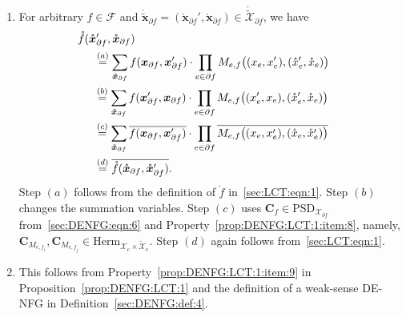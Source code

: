 \documentclass[journal]{IEEEtran}
\newcommand{\vect}[1]{ \bm{#1} }
\newcommand{\set}[1]{\mathcal{#1}}
\newcommand{\setF}{ \mathcal{F} }
\newcommand{\setpf}{ \partial f }
\newcommand{\vx}{ \vect{x} }
\newcommand{\setHerm}[1]{ \mathrm{Herm}_{#1} }
\newcommand{\setPSD}[1]{ \mathrm{PSD}_{#1} }
\newcommand{\matr}[1]{\vect{#1}}
\newcommand{\LCTtset}[1]{\mathring{\tilde{\mathcal{#1}}}}
\newcommand{\LCTset}[1]{\mathring{\mathcal{#1}}}
\newcommand{\LCTtv}[1]{ \mathring{ \tilde{ \vect{#1} } } }
\newcommand{\LCTv}[1]{ \mathring{ \vect{#1} } }
\newcommand{\LCT}[1]{ \mathring{#1} }
\newcommand{\ef}{ e,f }
\newcommand{\efi}{ e,f_i }
\newcommand{\efj}{ e,f_j }
\newcommand{\tvx}{ \tilde{\vect{x}}  }
\begin{document}
\begin{appendices}
\begin{enumerate}
    \item[9)] For arbitrary $ f \in \setF $ and
          $ \LCTtv{x}_{\setpf} = (\LCTv{x}_{\setpf}', \LCTv{x}_{\setpf}) \in
            \LCTtset{X}_{\setpf} $, we have
          \begin{align*}
             & \hspace{-0.5cm}
            \LCT{f}(\LCTv{x}_{\setpf}', \LCTv{x}_{\setpf})
            \\& \overset{(a)}{=}
            \sum_{ \tvx_{\setpf} }
            f( \vx_{\setpf}, \vx_{\setpf}' )
            \cdot
            \prod_{e \in \setpf}
            M_{\ef}\bigl( (x_{e}, x_{e}'), (\LCT{x}_e', \LCT{x}_e) \bigr)
            \nonumber                                                                        \\
             & \overset{(b)}{=}
            \sum_{ \tvx_{\setpf} }
            f( \vx_{\setpf}', \vx_{\setpf} )
            \cdot
            \prod_{e \in \setpf}
            M_{\ef}\bigl( (x_{e}', x_{e}), (\LCT{x}_e', \LCT{x}_e) \bigr)
            \nonumber                                                                        \\
             & \overset{(c)}{=}
            \sum_{ \tvx_{\setpf} }
            \overline{f( \vx_{\setpf}, \vx_{\setpf}' )}
            \cdot
            \prod_{e \in \setpf}
            \overline{
              M_{\ef}\bigl( (x_{e}, x_{e}'), (\LCT{x}_e, \LCT{x}_e') \bigr)
            }
            \nonumber                                                                        \\
             & \overset{(d)}{=} \overline{ \LCT{f}(\LCTv{x}_{\setpf}, \LCTv{x}_{\setpf}') }.
          \end{align*}
          Step $(a)$ follows from the definition of $ \LCT{f} $
          in~\eqref{sec:LCT:eqn:1}.  Step $(b)$ changes the summation
          variables.  Step $(c)$ uses
          $ \matr{C}_{f} \in \setPSD{\set{X}_{\setpf}} $
          from~\eqref{sec:DENFG:eqn:6} and
          Property~\ref{prop:DENFG:LCT:1:item:8}, namely,
          $\matr{ C }_{ M_{\efi} },\matr{ C }_{ M_{\efj} } \in
            \setHerm{\set{X}_{e}\times\LCTset{X}_{e}}$.  Step $(d)$ again
          follows from~\eqref{sec:LCT:eqn:1}.

    \item[10)] This follows from Property~\ref{prop:DENFG:LCT:1:item:9} in
          Proposition~\ref{prop:DENFG:LCT:1} and the definition of a
          weak-sense DE-NFG in Definition~\ref{sec:DENFG:def:4}.


\end{enumerate}
\end{appendices}
\end{document}
